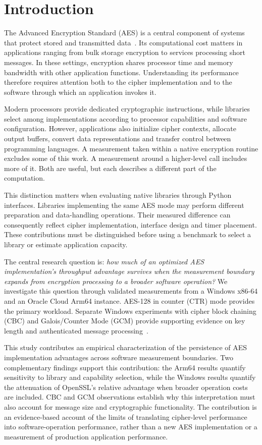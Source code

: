\section{Introduction}
\label{sec:intro}
The Advanced Encryption Standard (AES) is a central component of systems that protect stored and transmitted data~\cite{fips197}. Its computational cost matters in applications ranging from bulk storage encryption to services processing short messages. In these settings, encryption shares processor time and memory bandwidth with other application functions. Understanding its performance therefore requires attention both to the cipher implementation and to the software through which an application invokes it.

Modern processors provide dedicated cryptographic instructions, while libraries select among implementations according to processor capabilities and software configuration. However, applications also initialize cipher contexts, allocate output buffers, convert data representations and transfer control between programming languages. A measurement taken within a native encryption routine excludes some of this work. A measurement around a higher-level call includes more of it. Both are useful, but each describes a different part of the computation.

This distinction matters when evaluating native libraries through Python interfaces. Libraries implementing the same AES mode may perform different preparation and data-handling operations. Their measured difference can consequently reflect cipher implementation, interface design and timer placement. These contributions must be distinguished before using a benchmark to select a library or estimate application capacity.

The central research question is: \emph{how much of an optimized AES implementation's throughput advantage survives when the measurement boundary expands from encryption processing to a broader software operation?} We investigate this question through validated measurements from a Windows x86-64 and an Oracle Cloud Arm64 instance. AES-128 in counter (CTR) mode provides the primary workload. Separate Windows experiments with cipher block chaining (CBC) and Galois/Counter Mode (GCM) provide supporting evidence on key length and authenticated message processing~\cite{sp80038a,sp80038d}.

This study contributes an empirical characterization of the persistence of AES implementation advantages across software measurement boundaries. Two complementary findings support this contribution: the Arm64 results quantify sensitivity to library and capability selection, while the Windows results quantify the attenuation of OpenSSL's relative advantage when broader operation costs are included. CBC and GCM observations establish why this interpretation must also account for message size and cryptographic functionality. The contribution is an evidence-based account of the limits of translating cipher-level performance into software-operation performance, rather than a new AES implementation or a measurement of production application performance.

